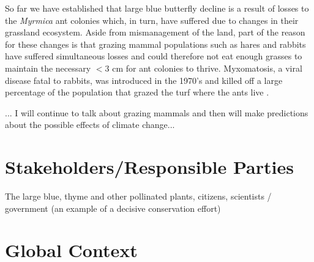 \documentclass[12pt, twocolumn, letterpaper]{article}
\begin{document}
 So far we have established that large blue butterfly decline is a result of losses to the \textit{Myrmica} ant colonies which, in turn, have suffered due to changes in their grassland ecosystem. Aside from mismanagement of the land, part of the reason for these changes is that grazing mammal populations such as hares and rabbits have suffered simultaneous losses and could therefore not eat enough grasses to maintain the necessary $<3$ cm for ant colonies to thrive. Myxomatosis, a viral disease fatal to rabbits, was introduced in the 1970's and killed off a large percentage of the population that grazed the turf where the ants live \cite{noauthor_how_2009}. 
 
 ... I will continue to talk about grazing mammals and then will make predictions about the possible effects of climate change... 

\section*{Stakeholders/Responsible Parties}
The large blue, 
thyme and other pollinated plants, 
citizens, 
scientists / government (an example of a decisive conservation effort) 
\section*{Global Context} 
	


\end{document}
